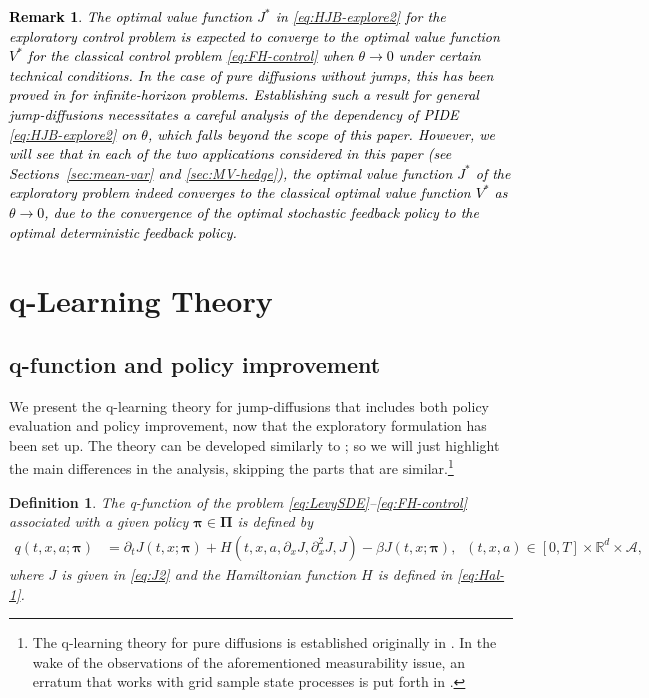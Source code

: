 \documentclass[11pt]{article}
\newtheorem{definition}{Definition}
\newtheorem{remark}{Remark}
\newcommand{\1}{\mathbbm{1}}
\newcommand{\gao}[1]{\textcolor{black}{{#1}}}
\begin{document}
\gao{
\begin{remark}
The optimal value function $ J^*$ in \eqref{eq:HJB-explore2} for the exploratory control problem is expected to converge to the optimal value function $V^*$ for the classical control problem \eqref{eq:FH-control} when $\theta \rightarrow 0$ under certain technical conditions. In the case of pure diffusions without jumps, this has been proved in \cite{tang2022exploratory} for infinite-horizon problems. Establishing such a result for general jump-diffusions necessitates a careful analysis of the dependency of PIDE \eqref{eq:HJB-explore2} on $\theta$, which falls beyond the scope of this paper.
 However, we will see that in each of the two applications considered in this paper (see Sections~\ref{sec:mean-var} and \ref{sec:MV-hedge}), the optimal value function $J^*$ of the exploratory problem indeed converges to the classical optimal value function $V^*$  as $\theta \rightarrow 0$,  due to the convergence of the optimal stochastic feedback policy to the optimal deterministic feedback policy.
\end{remark}
}
\section{q-Learning Theory} \label{sec:qlearn}
\subsection{q-function and policy improvement}

We present the q-learning theory for jump-diffusions that includes both policy evaluation and policy improvement, now that the exploratory formulation has been set up. The theory can be developed similarly to \cite{jia2022q,jia2025erratum}; so we will just highlight the main differences in the analysis, skipping the parts that are similar.\footnote{The q-learning theory for pure diffusions is established originally in \cite{jia2022q}. In the wake of the observations of the aforementioned measurability issue, an erratum that works with grid sample state processes is put forth in \cite{jia2025erratum}.}

\begin{definition}\label{eq：q-def}
The q-function of the problem \eqref{eq:LevySDE}--\eqref{eq:FH-control} associated with a given policy $\boldsymbol{\pi} \in \boldsymbol{\Pi}$ is defined by
\begin{align}
	q(t,x, a; \boldsymbol{\pi}) & =
	\partial_t J(t, x; \boldsymbol{\pi}) +   H(t,x, a, \partial_xJ,  \partial_x^2J, J) - \beta J(t, x; \boldsymbol{\pi}),\;\;(t,x,a) \in [0, T] \times \mathbb{R}^d \times \mathcal{A},
\end{align}
where $J$ is given in \eqref{eq:J2} and the Hamiltonian function $H$ is defined in \eqref{eq:Hal-1}.
\end{definition}
\end{document}
